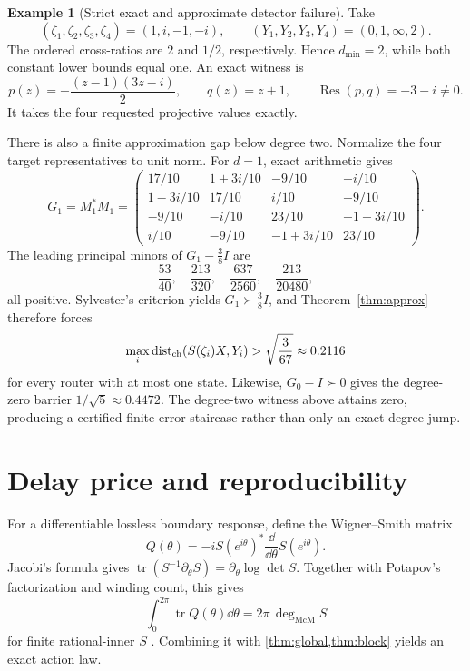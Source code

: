 \documentclass[11pt]{article}
\theoremstyle{definition}\newtheorem{definition}[theorem]{Definition}\newtheorem{example}[theorem]{Example}
\theoremstyle{remark}\newtheorem{remark}[theorem]{Remark}\newtheorem{limitation}[theorem]{Limitation}
\newcommand{\Res}{\operatorname{Res}}\newcommand{\mcdeg}{\deg_{\mathrm{McM}}}
\begin{document}
\begin{example}[Strict exact and approximate detector failure]\label{ex:strict}
Take
\[
 (\zeta_1,\zeta_2,\zeta_3,\zeta_4)=(1,i,-1,-i),\qquad
 (Y_1,Y_2,Y_3,Y_4)=(0,1,\infty,2).
\]
The ordered cross-ratios are $2$ and $1/2$, respectively.  Hence
$d_{\min}=2$, while both constant lower bounds equal one.  An exact witness is
\[
 p(z)=-\frac{(z-1)(3z-i)}2,\qquad q(z)=z+1,
 \qquad \Res(p,q)=-3-i\ne0.
\]
It takes the four requested projective values exactly.

There is also a finite approximation gap below degree two.  Normalize the four
target representatives to unit norm.  For $d=1$, exact arithmetic gives
\[
G_1=M_1^*M_1=
\begin{pmatrix}
17/10&1+3i/10&-9/10&-i/10\\
1-3i/10&17/10&i/10&-9/10\\
-9/10&-i/10&23/10&-1-3i/10\\
i/10&-9/10&-1+3i/10&23/10
\end{pmatrix}.
\]
The leading principal minors of $G_1-\frac38I$ are
\[
 \frac{53}{40},\quad\frac{213}{320},\quad
 \frac{637}{2560},\quad\frac{213}{20480},
\]
all positive.  Sylvester's criterion yields $G_1\succ\frac38I$, and
Theorem~\ref{thm:approx} therefore forces
\[
 \max_i\operatorname{dist}_{\rm ch}(S(\zeta_i)X,Y_i)
 >\sqrt{\frac{3}{67}}\approx0.2116
\]
for every router with at most one state.  Likewise,
$G_0-I\succ0$ gives the degree-zero barrier $1/\sqrt5\approx0.4472$.
The degree-two witness above attains zero, producing a certified finite-error
staircase rather than only an exact degree jump.
\end{example}

\section{Delay price and reproducibility}

For a differentiable lossless boundary response, define the Wigner--Smith
matrix
\[
                  Q(\theta)=-iS(e^{i\theta})^*
                             \frac{\dd}{\dd\theta}S(e^{i\theta}).
\]
Jacobi's formula gives
$\operatorname{tr}(S^{-1}\partial_\theta S)=\partial_\theta\log\det S$.
Together with Potapov's factorization and winding count, this gives
\[
             \int_0^{2\pi}\operatorname{tr}Q(\theta)\dd\theta
             =2\pi\,\mcdeg S
\]
for finite rational-inner $S$ \cite{Wigner1955,Smith1960}.  Combining it with
\cref{thm:global,thm:block} yields an exact action law.
\end{document}
